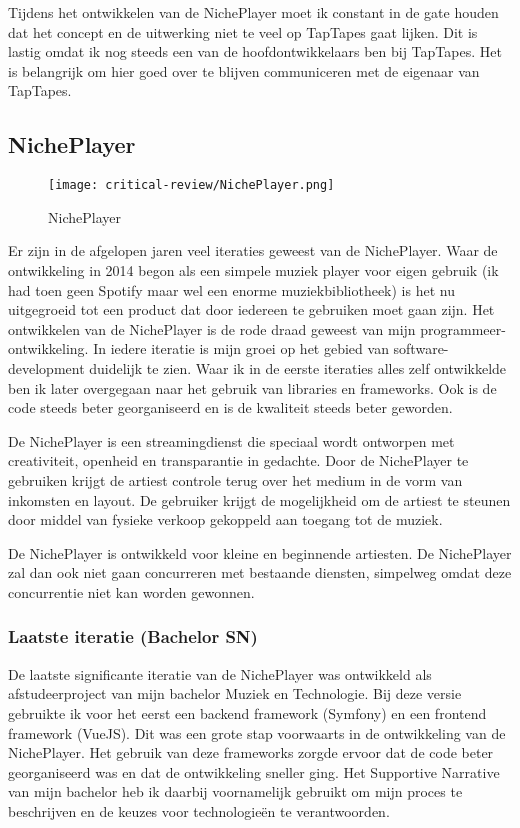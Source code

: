 Tijdens het ontwikkelen van de NichePlayer moet ik constant in de gate houden dat het concept en de uitwerking niet te veel op TapTapes gaat lijken. Dit is lastig omdat ik nog steeds een van de hoofdontwikkelaars ben bij TapTapes. Het is belangrijk om hier goed over te blijven communiceren met de eigenaar van TapTapes.

\subsection{NichePlayer}
\begin{wrapfigure}{r}{0.25\textwidth}
    \centering
    \texttt{[image: critical-review/NichePlayer.png]}
    \caption{NichePlayer}
    \label{fig:critical-review:NichePlayer}
\end{wrapfigure}

Er zijn in de afgelopen jaren veel iteraties geweest van de NichePlayer. Waar de ontwikkeling in 2014 begon als een simpele muziek player voor eigen gebruik (ik had toen geen Spotify maar wel een enorme muziekbibliotheek) is het nu uitgegroeid tot een product dat door iedereen te gebruiken moet gaan zijn. Het ontwikkelen van de NichePlayer is de rode draad geweest van mijn programmeer-ontwikkeling. In iedere iteratie is mijn groei op het gebied van software-development duidelijk te zien. Waar ik in de eerste iteraties alles zelf ontwikkelde ben ik later overgegaan naar het gebruik van libraries en frameworks. Ook is de code steeds beter georganiseerd en is de kwaliteit steeds beter geworden.

De NichePlayer is een streamingdienst die speciaal wordt ontworpen met creativiteit, openheid en transparantie in gedachte. Door de NichePlayer te gebruiken krijgt de artiest controle terug over het medium in de vorm van inkomsten en layout. De gebruiker krijgt de mogelijkheid om de artiest te steunen door middel van fysieke verkoop gekoppeld aan toegang tot de muziek. 

De NichePlayer is ontwikkeld voor kleine en beginnende artiesten. De NichePlayer zal dan ook niet gaan concurreren met bestaande diensten, simpelweg omdat deze concurrentie niet kan worden gewonnen.

\subsubsection*{Laatste iteratie (Bachelor SN)}
De laatste significante iteratie van de NichePlayer was ontwikkeld als afstudeerproject van mijn bachelor Muziek en Technologie. Bij deze versie gebruikte ik voor het eerst een backend framework (Symfony) en een frontend framework (VueJS). Dit was een grote stap voorwaarts in de ontwikkeling van de NichePlayer. Het gebruik van deze frameworks zorgde ervoor dat de code beter georganiseerd was en dat de ontwikkeling sneller ging. Het Supportive Narrative van mijn bachelor heb ik daarbij voornamelijk gebruikt om mijn proces te beschrijven en de keuzes voor technologieën te verantwoorden.

